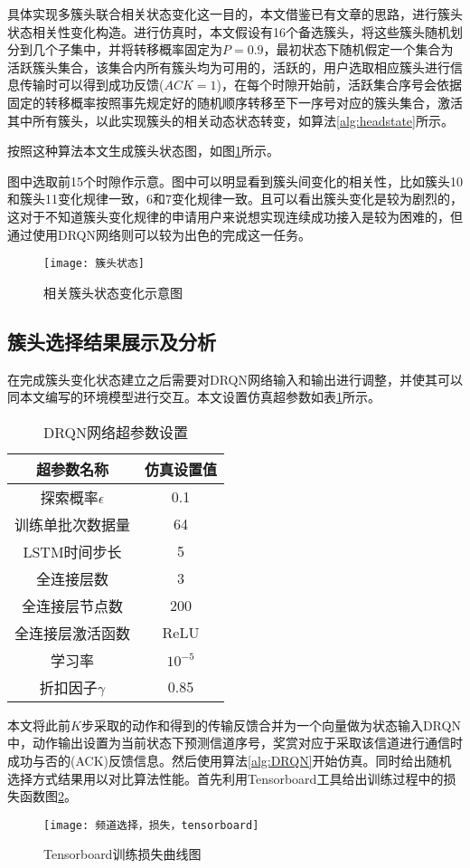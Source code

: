 具体实现多簇头联合相关状态变化这一目的，本文借鉴已有文章的思路\cite{8303773}，进行簇头状态相关性变化构造。进行仿真时，本文假设有16个备选簇头，将这些簇头随机划分到几个子集中，并将转移概率固定为$P=0.9$，最初状态下随机假定一个集合为活跃簇头集合，该集合内所有簇头均为可用的，活跃的，用户选取相应簇头进行信息传输时可以得到成功反馈($ACK=1$)，在每个时隙开始前，活跃集合序号会依据固定的转移概率按照事先规定好的随机顺序转移至下一序号对应的簇头集合，激活其中所有簇头，以此实现簇头的相关动态状态转变，如算法\ref{alg:headstate}所示。


按照这种算法本文生成簇头状态图，如图\ref{fig:簇头状态}所示。

图中选取前15个时隙作示意。图中可以明显看到簇头间变化的相关性，比如簇头10和簇头11变化规律一致，6和7变化规律一致。且可以看出簇头变化是较为剧烈的，这对于不知道簇头变化规律的申请用户来说想实现连续成功接入是较为困难的，但通过使用DRQN网络则可以较为出色的完成这一任务。
\begin{figure}[htbp]
	\centering
	\texttt{[image: 簇头状态]}
	\caption{相关簇头状态变化示意图}
	\label{fig:簇头状态}
\end{figure}


\subsection{簇头选择结果展示及分析}
在完成簇头变化状态建立之后需要对DRQN网络输入和输出进行调整，并使其可以同本文编写的环境模型进行交互。本文设置仿真超参数如表\ref{tab:超参数}所示。
\begin{table}[htbp]
	\caption{DRQN网络超参数设置}\label{tab:超参数}
	\vspace{0.5em}\centering\wuhao
	\begin{tabular}{cc}
		\toprule[1.5pt]
		超参数名称 & 仿真设置值 \\
		\midrule[1pt]
		探索概率$\epsilon$ & 0.1 \\
		训练单批次数据量 & 64\\
		LSTM时间步长 & 5 \\
		全连接层数 & 3 \\
		全连接层节点数 & 200 \\
		全连接层激活函数 & ReLU \\
		学习率 & $10^{-5}$ \\
		折扣因子$\gamma$ & 0.85 \\
		\bottomrule[1.5pt]
	\end{tabular}
\end{table}

本文将此前$K$步采取的动作和得到的传输反馈合并为一个向量做为状态输入DRQN中，动作输出设置为当前状态下预测信道序号，奖赏对应于采取该信道进行通信时成功与否的(ACK)反馈信息。然后使用算法\ref{alg:DRQN}开始仿真。同时给出随机选择方式结果用以对比算法性能。首先利用Tensorboard工具给出训练过程中的损失函数图\ref{fig：簇头训练loss}。 
\begin{figure}[htbp]
	\centering
	\texttt{[image: 频道选择，损失，tensorboard]}
	\caption{Tensorboard训练损失曲线图}
	\label{fig：簇头训练loss}
\end{figure}

